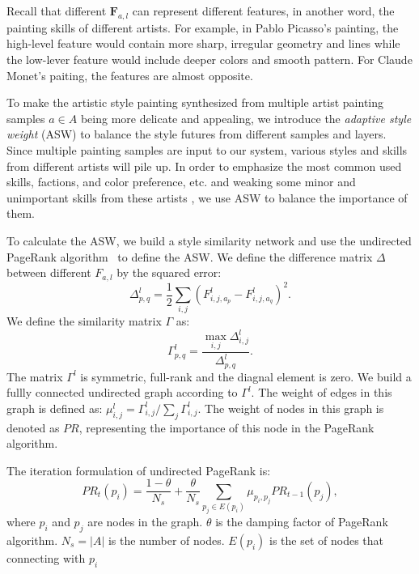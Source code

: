 \documentclass[10pt,twocolumn,letterpaper]{article}
\begin{document}
Recall that different $\bm{F}_{a, l}$ can represent different features, in another word, the painting skills of different artists. For example, in Pablo Picasso's painting, the high-level feature would contain more sharp, irregular geometry and lines while the low-lever feature would include deeper colors and smooth pattern. For Claude Monet's paiting, the features are almost opposite.

To make the artistic style painting synthesized from multiple artist painting samples $a\in A$ being more delicate and appealing, we introduce the \textit{adaptive style weight} (ASW) to balance the style futures from different samples and layers. Since multiple painting samples are input to our system, various styles and skills from different artists will pile up. In order to emphasize the most common used skills, factions, and color preference, etc. and weaking some minor and unimportant skills from these artists , we use ASW to balance the importance of them.

To calculate the ASW, we build a style similarity network and use the undirected PageRank algorithm~\cite{grolmusz2012note} to define the ASW.
We define the difference matrix $\Delta$ between different $F_{a, l}$ by the squared error:
\begin{equation}
\Delta_{p, q}^l = \frac{1}{2}\sum_{i, j}(F_{i, j, a_p}^l - F_{i, j, a_q}^l)^2.
\end{equation}
We define the similarity matrix $\Gamma$ as:
\begin{equation}
\Gamma_{p, q}^l = \frac{ \max_{i, j}\Delta_{i, j}^l } { \Delta^l_{p, q}}.
\end{equation}
The matrix $\Gamma^l$ is symmetric, full-rank and the diagnal element is zero. We build a fullly connected undirected graph according to $\Gamma^l$. The weight of edges in this graph is defined as: $\mu_{i, j}^l = \Gamma^l_{i, j} / \sum_{j}\Gamma^l_{i, j}$. The weight of nodes in this graph is denoted as $PR$, representing the importance of this node in the PageRank algorithm.

The iteration formulation of undirected PageRank is:
\begin{equation}
PR_t(p_i) = \frac{1-\theta}{N_s} + \frac{\theta}{N_s} \sum_{p_j\in E(p_i)}\mu_{p_i, p_j}PR_{t-1}(p_j),
\end{equation}\label{equ::pagerank}
where $p_i$ and $p_j$ are nodes in the graph. $\theta$ is the damping factor of PageRank algorithm. $N_s = |A|$ is the number of nodes. $E(p_i)$ is the set of nodes that connecting with $p_i$
\end{document}
